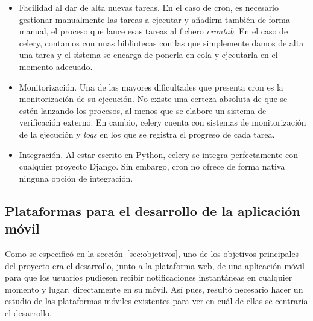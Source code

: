 \begin{itemize}
\item Facilidad al dar de alta nuevas tareas. En el caso de cron, es necesario
  gestionar manualmente las tareas a ejecutar y añadirm también de forma manual,
  el proceso que lance esas tareas al fichero \textit{crontab}. En el caso de
  celery, contamos con unas bibliotecas con las que simplemente damos de alta
  una tarea y el sistema se encarga de ponerla en cola y ejecutarla en el
  momento adecuado.

\item Monitorización. Una de las mayores dificultades que presenta cron es la
  monitorización de su ejecución. No existe una certeza absoluta de que se estén
  lanzando los procesos, al menos que se elabore un sistema de verificación
  externo. En cambio, celery cuenta con sistemas de monitorización de la
  ejecución y \textit{logs} en los que se registra el progreso de cada tarea.

\item Integración. Al estar escrito en Python, celery se integra perfectamente
  con cualquier proyecto Django. Sin embargo, cron no ofrece de forma nativa
  ninguna opción de integración.

\end{itemize}

\subsection{Plataformas para el desarrollo de la aplicación móvil}

Como se especificó en la sección~\ref{sec:objetivos}, uno de los objetivos
principales del proyecto era el desarrollo, junto a la plataforma web, de una
aplicación móvil para que los usuarios pudiesen recibir notificaciones
instantáneas en cualquier momento y lugar, directamente en su móvil. Así pues,
resultó necesario hacer un estudio de las plataformas móviles existentes para
ver en cuál de ellas se centraría el desarrollo.

